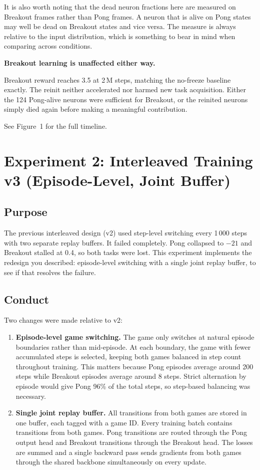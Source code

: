 \documentclass[11pt,a4paper]{article}
\begin{document}
It is also worth noting that the dead neuron fractions here are measured on Breakout frames
rather than Pong frames. A neuron that is alive on Pong states may well be dead on Breakout
states and vice versa. The measure is always relative to the input distribution, which is
something to bear in mind when comparing across conditions.

\textbf{Breakout learning is unaffected either way.}

Breakout reward reaches 3.5 at 2\,M steps, matching the no-freeze baseline exactly. The
reinit neither accelerated nor harmed new task acquisition. Either the 124 Pong-alive
neurons were sufficient for Breakout, or the reinited neurons simply died again before
making a meaningful contribution.

See Figure~1 for the full timeline.

\section{Experiment 2: Interleaved Training v3 (Episode-Level, Joint Buffer)}

\subsection*{Purpose}

The previous interleaved design (v2) used step-level switching every 1\,000 steps with
two separate replay buffers. It failed completely. Pong collapsed to $-21$ and Breakout
stalled at 0.4, so both tasks were lost. This experiment implements the redesign you
described: episode-level switching with a single joint replay buffer, to see if that
resolves the failure.

\subsection*{Conduct}

Two changes were made relative to v2:

\begin{enumerate}[leftmargin=1.5em]
  \item \textbf{Episode-level game switching.} The game only switches at natural episode
        boundaries rather than mid-episode. At each boundary, the game with fewer
        accumulated steps is selected, keeping both games balanced in step count throughout
        training. This matters because Pong episodes average around 200 steps while
        Breakout episodes average around 8 steps. Strict alternation by episode would
        give Pong 96\% of the total steps, so step-based balancing was necessary.

  \item \textbf{Single joint replay buffer.} All transitions from both games are stored
        in one buffer, each tagged with a game ID. Every training batch contains
        transitions from both games. Pong transitions are routed through the Pong output
        head and Breakout transitions through the Breakout head. The losses are summed
        and a single backward pass sends gradients from both games through the shared
        backbone simultaneously on every update.
\end{enumerate}
\end{document}
